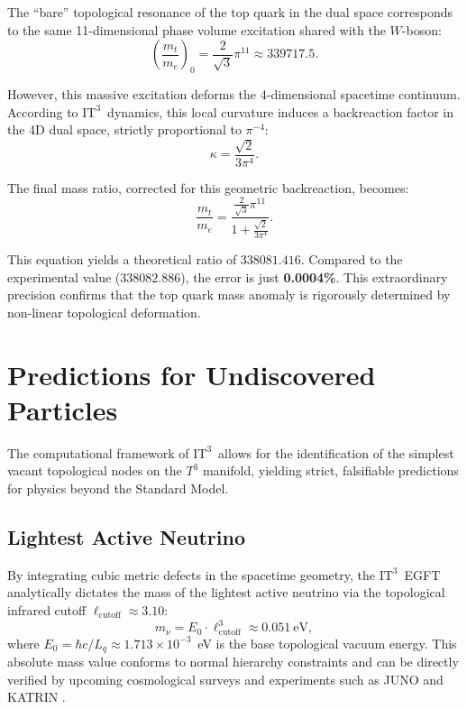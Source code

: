 \documentclass[onecolumn,aps,prd,superscriptaddress,nofootinbib,amsmath,amssymb]{revtex4-2}
\newcommand{\ITthree}{\ensuremath{\mathrm{IT}^3}}
\begin{document}
The ``bare'' topological resonance of the top quark in the dual space corresponds to the same 11-dimensional phase volume excitation shared with the $W$-boson:
\begin{equation}
    \left( \frac{m_t}{m_e} \right)_0 = \frac{2}{\sqrt{3}} \pi^{11} \approx 339717.5.
\end{equation}

However, this massive excitation deforms the 4-dimensional spacetime continuum. According to \ITthree\ dynamics, this local curvature induces a backreaction factor in the 4D dual space, strictly proportional to $\pi^{-4}$:
\begin{equation}
    \kappa = \frac{\sqrt{2}}{3\pi^4}.
\end{equation}

The final mass ratio, corrected for this geometric backreaction, becomes:
\begin{equation}
    \frac{m_t}{m_e} = \frac{\frac{2}{\sqrt{3}}\pi^{11}}{1 + \frac{\sqrt{2}}{3\pi^4}}.
    \label{eq:top_quark}
\end{equation}

This equation yields a theoretical ratio of $338081.416$. Compared to the experimental value ($338082.886$), the error is just \textbf{0.0004\%}. This extraordinary precision confirms that the top quark mass anomaly is rigorously determined by non-linear topological deformation.

\section{Predictions for Undiscovered Particles}
\label{sec:predictions}
The computational framework of \ITthree\ allows for the identification of the simplest vacant topological nodes on the $T^3$ manifold, yielding strict, falsifiable predictions for physics beyond the Standard Model.

\subsection{Lightest Active Neutrino}
By integrating cubic metric defects in the spacetime geometry, the \ITthree\ EGFT analytically dictates the mass of the lightest active neutrino via the topological infrared cutoff $\ell_{\text{cutoff}} \approx 3.10$:
\begin{equation}
    m_{\nu} = E_0 \cdot \ell_{\text{cutoff}}^3 \approx 0.051~\text{eV},
    \label{eq:neutrino_mass}
\end{equation}
where $E_0 = \hbar c / L_q \approx 1.713 \times 10^{-3}$~eV is the base topological vacuum energy. This absolute mass value conforms to normal hierarchy constraints and can be directly verified by upcoming cosmological surveys and experiments such as JUNO and KATRIN \cite{ktr2025}.
\end{document}
